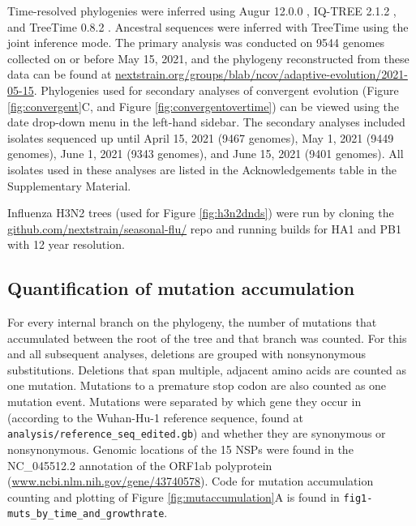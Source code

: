 \documentclass[11pt,oneside,letterpaper]{article}
\begin{document}
Time-resolved phylogenies were inferred using Augur 12.0.0 \cite{Huddleston2021-uh}, IQ-TREE 2.1.2 \cite{Nguyen2015-bp}, and TreeTime 0.8.2 \cite{Sagulenko2018-ok}.
Ancestral sequences were inferred with TreeTime using the joint inference mode. The primary analysis was conducted on 9544 genomes collected on or before May 15, 2021, and the phylogeny reconstructed from these data can be found at \href{https://nextstrain.org/groups/blab/ncov/adaptive-evolution/2021-05-15}{nextstrain.org/groups/blab/ncov/adaptive-evolution/2021-05-15}.
Phylogenies used for secondary analyses of convergent evolution (Figure \ref{fig:convergent}C, and Figure \ref{fig:convergentovertime}) can be viewed using the date drop-down menu in the left-hand sidebar.
The secondary analyses included isolates sequenced up until April 15, 2021 (9467 genomes), May 1, 2021 (9449 genomes), June 1, 2021 (9343 genomes), and June 15, 2021 (9401 genomes).
All isolates used in these analyses are listed in the Acknowledgements table in the Supplementary Material.

Influenza H3N2 trees (used for Figure \ref{fig:h3n2dnds}) were run by cloning the \href{https://github.com/nextstrain/seasonal-flu/}{github.com/nextstrain/seasonal-flu/} repo and running builds for HA1 and PB1 with 12 year resolution.

\subsection*{Quantification of mutation accumulation}
For every internal branch on the phylogeny, the number of mutations that accumulated between the root of the tree and that branch was counted.
For this and all subsequent analyses, deletions are grouped with nonsynonymous substitutions. Deletions that span multiple, adjacent amino acids are counted as one mutation.
Mutations to a premature stop codon are also counted as one mutation event.
Mutations were separated by which gene they occur in (according to the Wuhan-Hu-1 reference sequence, found at \texttt{analysis/reference\_seq\_edited.gb}) and whether they are synonymous or nonsynonymous.
Genomic locations of the 15 NSPs were found in the NC\_045512.2 annotation of the ORF1ab polyprotein (\href{https://www.ncbi.nlm.nih.gov/gene/43740578}{www.ncbi.nlm.nih.gov/gene/43740578}). Code for mutation accumulation counting and plotting of Figure \ref{fig:mutaccumulation}A is found in \texttt{fig1-muts\_by\_time\_and\_growthrate}.
\end{document}
